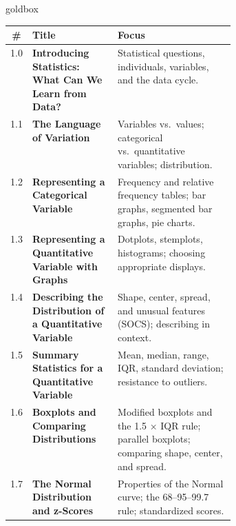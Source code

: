 \documentclass[10pt]{article}
\begin{document}
\renewcommand{\arraystretch}{1.6}
\boxguard
\begin{skillbox}{goldbox}
\begin{tabularx}{\linewidth}{@{} c >{\bfseries}p{0.38\linewidth} X @{}}
  \textbf{\#} & \textbf{Title} & \textbf{Focus} \\
  \hline
  1.0 & Introducing Statistics: What Can We Learn from Data?
    & Statistical questions, individuals, variables, and the data cycle. \\
  \hline
  1.1 & The Language of Variation
    & Variables vs.\ values; categorical vs.\ quantitative variables; distribution. \\
  \hline
  1.2 & Representing a Categorical Variable
    & Frequency and relative frequency tables; bar graphs, segmented bar graphs,
      pie charts. \\
  \hline
  1.3 & Representing a Quantitative Variable with Graphs
    & Dotplots, stemplots, histograms; choosing appropriate displays. \\
  \hline
  1.4 & Describing the Distribution of a Quantitative Variable
    & Shape, center, spread, and unusual features (SOCS); describing in context. \\
  \hline
  1.5 & Summary Statistics for a Quantitative Variable
    & Mean, median, range, IQR, standard deviation; resistance to outliers. \\
  \hline
  1.6 & Boxplots and Comparing Distributions
    & Modified boxplots and the 1.5 × IQR rule; parallel boxplots; comparing
      shape, center, and spread. \\
  \hline
  1.7 & The Normal Distribution and z-Scores
    & Properties of the Normal curve; the 68--95--99.7 rule; standardized scores. \\
  \hline
\end{tabularx}
\end{skillbox}

\vspace{0.18in}
\end{document}
